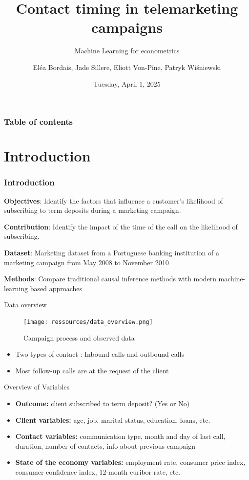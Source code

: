 \documentclass{beamer}
\title{Contact timing in telemarketing campaigns}
\subtitle{Machine Learning for econometrics}
\author{Eléa Bordais, Jade Sillere, Eliott Von-Pine, Patryk Wiśniewski}
\date{Tuesday, April 1, 2025}
\begin{document}
\frame{\titlepage}

\begin{frame}
\frametitle{Table of contents}
\tableofcontents
\end{frame}

\section{Introduction}
\begin{frame}
\frametitle{Introduction}

\textbf{Objectives}: Identify the factors that influence a customer's likelihood of subscribing to term deposits during a marketing campaign. 

\textbf{Contribution}: Identify the impact of the time of the call on the likelihood of subscribing.


\textbf{Dataset}: Marketing dataset from a Portuguese banking institution of a marketing campaign from May 2008 to November 2010

\textbf{Methods}: Compare traditional causal inference methods with modern machine-learning based approaches

\vspace{0.5cm}

\end{frame}

\begin{frame}{Data overview}
\begin{figure}
    \centering
    \texttt{[image: ressources/data\_overview.png]}
    \caption{Campaign process and observed data}
\end{figure}

\begin{itemize}
   \item Two types of contact : Inbound calls and outbound calls
   \item Most follow-up calls are at the request of the client
   \end{itemize}
\end{frame}

\begin{frame}{Overview of Variables}
\begin{itemize}
  \item \textbf{Outcome:} client subscribed to term deposit? (Yes or No)
  \item \textbf{Client variables:} age, job, marital status, education, loans, etc.
  \item \textbf{Contact variables: }communication type, month and day of last call, duration, number of contacts, info about previous campaign
  \item \textbf{State of the economy variables:} employment rate, consumer price index, consumer confidence index, 12-month euribor rate, etc.
\end{itemize}
\end{frame}
\end{document}
